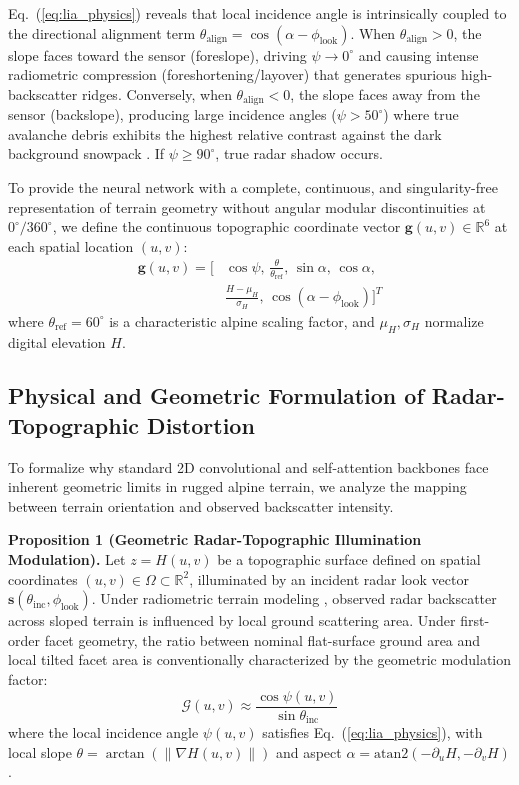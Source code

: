 Eq.~(\ref{eq:lia_physics}) reveals that local incidence angle is intrinsically coupled to the directional alignment term $\theta_{\text{align}} = \cos(\alpha - \phi_{\text{look}})$. When $\theta_{\text{align}} > 0$, the slope faces toward the sensor (foreslope), driving $\psi \to 0^\circ$ and causing intense radiometric compression (foreshortening/layover) that generates spurious high-backscatter ridges. Conversely, when $\theta_{\text{align}} < 0$, the slope faces away from the sensor (backslope), producing large incidence angles ($\psi > 50^\circ$) where true avalanche debris exhibits the highest relative contrast against the dark background snowpack \citep{tompkin2021backscatter}. If $\psi \ge 90^\circ$, true radar shadow occurs. 

To provide the neural network with a complete, continuous, and singularity-free representation of terrain geometry without angular modular discontinuities at $0^\circ / 360^\circ$, we define the continuous topographic coordinate vector $\mathbf{g}(u, v) \in \mathbb{R}^6$ at each spatial location $(u, v)$:
\begin{align}
\mathbf{g}(u, v) = \Big[ &\cos \psi, \, \frac{\theta}{\theta_{\text{ref}}}, \, \sin \alpha, \, \cos \alpha, \nonumber \\
&\frac{H - \mu_H}{\sigma_H}, \, \cos(\alpha - \phi_{\text{look}}) \Big]^T \label{eq:topo_vector}
\end{align}
where $\theta_{\text{ref}} = 60^\circ$ is a characteristic alpine scaling factor, and $\mu_H, \sigma_H$ normalize digital elevation $H$.

\subsection{Physical and Geometric Formulation of Radar-Topographic Distortion}
\label{sec:method:theory}

To formalize why standard 2D convolutional and self-attention backbones face inherent geometric limits in rugged alpine terrain, we analyze the mapping between terrain orientation and observed backscatter intensity.

\noindent\textbf{Proposition 1 (Geometric Radar-Topographic Illumination Modulation).} 
Let $z = H(u, v)$ be a topographic surface defined on spatial coordinates $(u, v) \in \Omega \subset \mathbb{R}^2$, illuminated by an incident radar look vector $\mathbf{s}(\theta_{\text{inc}}, \phi_{\text{look}})$. Under radiometric terrain modeling \citep{small2011flattening}, observed radar backscatter across sloped terrain is influenced by local ground scattering area. Under first-order facet geometry, the ratio between nominal flat-surface ground area and local tilted facet area is conventionally characterized by the geometric modulation factor:
\begin{equation}
\mathcal{G}(u, v) \approx \frac{\cos \psi(u, v)}{\sin \theta_{\text{inc}}}
\end{equation}
where the local incidence angle $\psi(u, v)$ satisfies Eq.~(\ref{eq:lia_physics}), with local slope $\theta = \arctan(\|\nabla H(u, v)\|)$ and aspect $\alpha = \text{atan2}(-\partial_u H, -\partial_v H)$.

